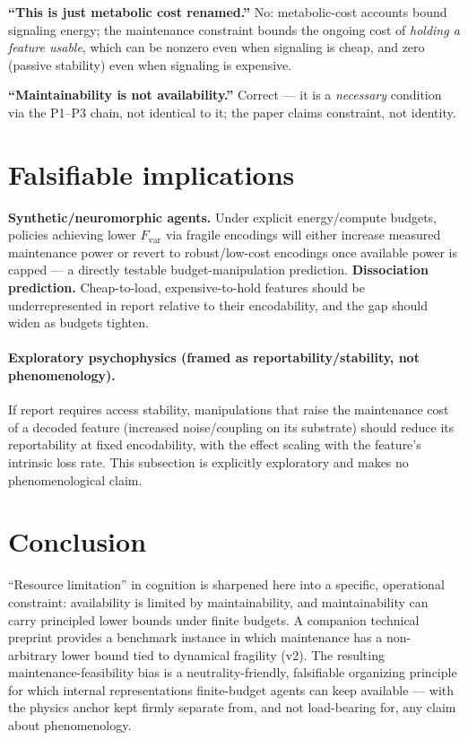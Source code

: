 \documentclass[11pt,a4paper]{article}
\begin{document}
\textbf{``This is just metabolic cost renamed.''} No: metabolic-cost accounts
bound signaling energy; the maintenance constraint bounds the ongoing cost of
\emph{holding a feature usable}, which can be nonzero even when signaling is
cheap, and zero (passive stability) even when signaling is expensive.

\textbf{``Maintainability is not availability.''} Correct --- it is a
\emph{necessary} condition via the P1--P3 chain, not identical to it; the
paper claims constraint, not identity.

\section{Falsifiable implications}

\textbf{Synthetic/neuromorphic agents.} Under explicit energy/compute budgets,
policies achieving lower $F_{\mathrm{var}}$ via fragile encodings will either
increase measured maintenance power or revert to robust/low-cost encodings
once available power is capped --- a directly testable budget-manipulation
prediction. \textbf{Dissociation prediction.} Cheap-to-load,
expensive-to-hold features should be underrepresented in report relative to
their encodability, and the gap should widen as budgets tighten.

\paragraph{Exploratory psychophysics (framed as reportability/stability, not
phenomenology).} If report requires access stability, manipulations that raise
the maintenance cost of a decoded feature (increased noise/coupling on its
substrate) should reduce its reportability at fixed encodability, with the
effect scaling with the feature's intrinsic loss rate. This subsection is
explicitly exploratory and makes no phenomenological claim.

\section{Conclusion}

``Resource limitation'' in cognition is sharpened here into a specific,
operational constraint: availability is limited by maintainability, and
maintainability can carry principled lower bounds under finite budgets. A
companion technical preprint provides a benchmark instance in which
maintenance has a non-arbitrary lower bound tied to dynamical fragility
\cite{Anchor,Work} (v2). The resulting maintenance-feasibility bias is a
neutrality-friendly, falsifiable organizing principle for which internal
representations finite-budget agents can keep available --- with the physics
anchor kept firmly separate from, and not load-bearing for, any claim about
phenomenology.
\end{document}
